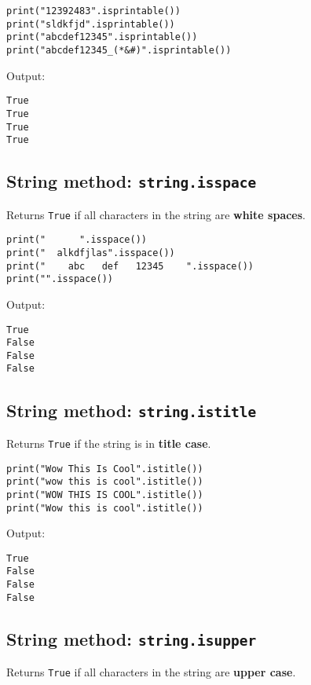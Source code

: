 \documentclass[11pt]{article}
\begin{document}
\begin{verbatim}
print("12392483".isprintable())
print("sldkfjd".isprintable())
print("abcdef12345".isprintable())
print("abcdef12345_(*&#)".isprintable())
\end{verbatim}

 \noindent Output:

\begin{verbatim}
True
True
True
True
\end{verbatim}


 \newpage

\subsection{String method: \texttt{string.isspace}}
\label{sec:org80df136}
Returns \texttt{True} if all characters in the string are \textbf{white spaces}.

\begin{verbatim}
print("      ".isspace())
print("  alkdfjlas".isspace())
print("    abc   def   12345    ".isspace())
print("".isspace())
\end{verbatim}

 \noindent Output:

\begin{verbatim}
True
False
False
False
\end{verbatim}

\subsection{String method: \texttt{string.istitle}}
\label{sec:org49e1997}
Returns \texttt{True} if the string is in \textbf{title case}.

\begin{verbatim}
print("Wow This Is Cool".istitle())
print("wow this is cool".istitle())
print("WOW THIS IS COOL".istitle())
print("Wow this is cool".istitle())
\end{verbatim}

 \noindent Output:

\begin{verbatim}
True
False
False
False
\end{verbatim}


 \newpage

\subsection{String method: \texttt{string.isupper}}
\label{sec:orgadf7921}
Returns \texttt{True} if all characters in the string are \textbf{upper case}.
\end{document}
